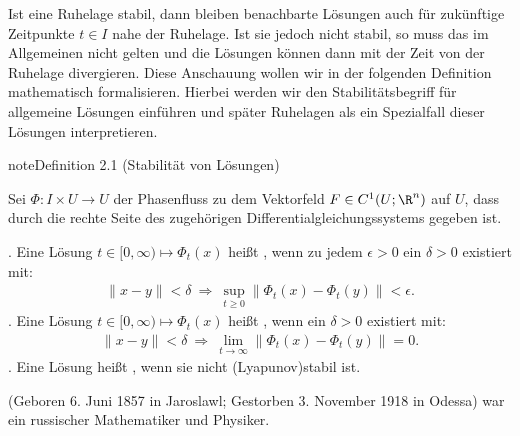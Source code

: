 \documentclass[letterpaper,10pt,english]{jupyterBook}
\begin{document}
\sphinxAtStartPar
Ist eine Ruhelage stabil, dann bleiben benachbarte Lösungen auch für zukünftige Zeitpunkte \(t \in I\) nahe der Ruhelage.
Ist sie jedoch nicht stabil, so muss das im Allgemeinen nicht gelten und die Lösungen können dann mit der Zeit von der Ruhelage divergieren.
Diese Anschauung wollen wir in der folgenden Definition mathematisch formalisieren.
Hierbei werden wir den Stabilitätsbegriff für allgemeine Lösungen einführen und später Ruhelagen als ein Spezialfall dieser Lösungen interpretieren.
\label{odestability/stabilitaetsbegriffe:def:Stabilitaet}
\begin{sphinxadmonition}{note}{Definition 2.1 (Stabilität von Lösungen)}



\sphinxAtStartPar
Sei \(\Phi \colon I \times U \rightarrow U\) der Phasenfluss zu dem Vektorfeld \(F\in C^1(U;\R^n)\) auf \(U\), dass durch die rechte Seite des zugehörigen Differentialgleichungssystems gegeben ist.

. Eine Lösung \(t \in [0,\infty) \mapsto \Phi_t(x)\) heißt , wenn zu jedem \(\epsilon > 0\) ein \(\delta>0\) existiert mit:
\begin{equation*}
\begin{split}\|x-y\|<\delta \ \Rightarrow \ \sup_{t\geq0}\|\Phi_t(x)-\Phi_t(y)\|<\epsilon.\end{split}
\end{equation*}
. Eine Lösung \( t \in [0,\infty) \mapsto \Phi_t(x)\) heißt , wenn ein \(\delta > 0\) existiert mit:
\begin{equation*}
\begin{split}\|x-y\|<\delta \ \Rightarrow \ \lim_{t\to\infty}\|\Phi_t(x)-\Phi_t(y)\|=0.\end{split}
\end{equation*}
. Eine Lösung heißt , wenn sie nicht (Lyapunov\sphinxhyphen{})stabil ist.
\end{sphinxadmonition}

\begin{sphinxShadowBox}

\sphinxAtStartPar
{} (Geboren 6. Juni 1857 in Jaroslawl; Gestorben 3. November 1918 in Odessa) war ein russischer Mathematiker und Physiker.
\end{sphinxShadowBox}
\end{document}
